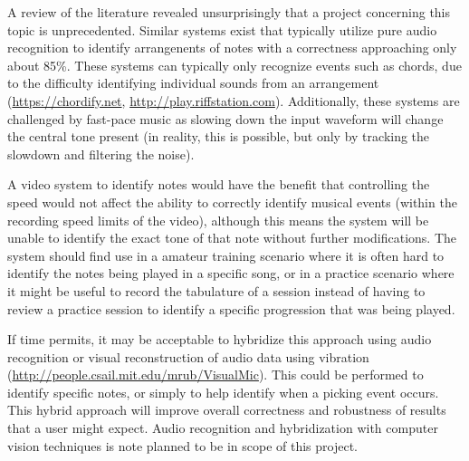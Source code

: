 A review of the literature revealed unsurprisingly that a project concerning this topic is unprecedented.
Similar systems exist that typically utilize pure audio recognition to identify arrangenents of notes with 
a correctness approaching only about 85\%.
These systems can typically only recognize events such as chords, due to the difficulty identifying individual sounds from an arrangement
(\url{https://chordify.net}, \url{http://play.riffstation.com}).
Additionally, these systems are challenged by fast-pace music as slowing down the input waveform will change
the central tone present (in reality, this is possible, but only by tracking the slowdown and filtering the noise).
\par

A video system to identify notes would have the benefit that controlling the speed would not affect the
ability to correctly identify musical events (within the recording speed limits of the video),
although this means the system will be unable to identify the exact tone of that note without further modifications.
The system should find use in a amateur training scenario where it is often hard to identify the notes being played in a specific song, 
or in a practice scenario where it might be useful to record the tabulature of a session
instead of having to review a practice session to identify a specific progression that was being played.
\par

If time permits, it may be acceptable to hybridize this approach using audio recognition or visual reconstruction of audio data using vibration
(\url{http://people.csail.mit.edu/mrub/VisualMic}).
This could be performed to identify specific notes, or simply to help identify when a picking event occurs.
This hybrid approach will improve overall correctness and robustness of results that a user might expect.
Audio recognition and hybridization with computer vision techniques is note planned to be in scope of this project.
